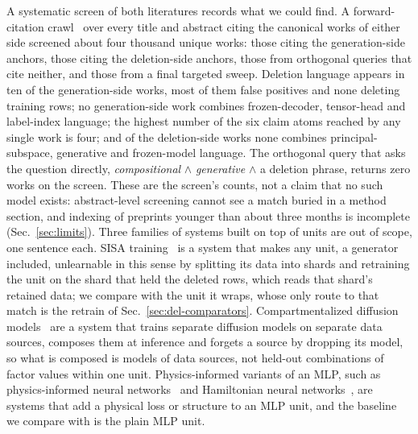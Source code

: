 \documentclass{article} %
\begin{document}
A systematic screen of both literatures records what we could find. A forward-citation
crawl~\citep{priem_openalex_2022} over every title and abstract citing the canonical works of either side screened
about four thousand unique works: those citing the generation-side anchors, those citing the
deletion-side anchors, those from orthogonal queries that cite neither, and those from
a final targeted sweep. %
Deletion language appears in ten of the generation-side works, most of them
false positives and none deleting training rows; no generation-side work combines frozen-decoder,
tensor-head and label-index language; the highest number of the six claim
atoms reached by any single work is four; and of the deletion-side works none combines
principal-subspace, generative and frozen-model language. %
The orthogonal query that asks the question directly, \emph{compositional} $\wedge$
\emph{generative} $\wedge$ a deletion phrase, returns zero works on the screen.
These are the screen's counts, not a claim that no such model exists: abstract-level screening
cannot see a match buried in a method section, and indexing of preprints younger than about
three months is incomplete (Sec.~\ref{sec:limits}).
Three families of systems built on top of units are out of scope, one sentence each.
SISA training~\citep{bourtoule_machine_2021} is a system that makes any unit, a generator included,
unlearnable in this sense by splitting its data into shards and retraining the unit on the shard that
held the deleted rows, which reads that shard's retained data; we compare with the unit it wraps,
whose only route to that match is the retrain of Sec.~\ref{sec:del-comparators}.
Compartmentalized diffusion models~\citep{golatkar_training_2024} are a system that
trains separate diffusion models on separate data sources, composes them at inference and forgets
a source by dropping its model, so what is composed is models of data sources, not held-out
combinations of factor values within one unit.
Physics-informed variants of an MLP, such as physics-informed neural
networks~\citep{raissi_physics-informed_2019} and Hamiltonian neural networks~\citep{greydanus_hamiltonian_2019}, are
systems that add a physical loss or structure to an MLP unit, and the baseline we compare with is the
plain MLP unit.
\end{document}
